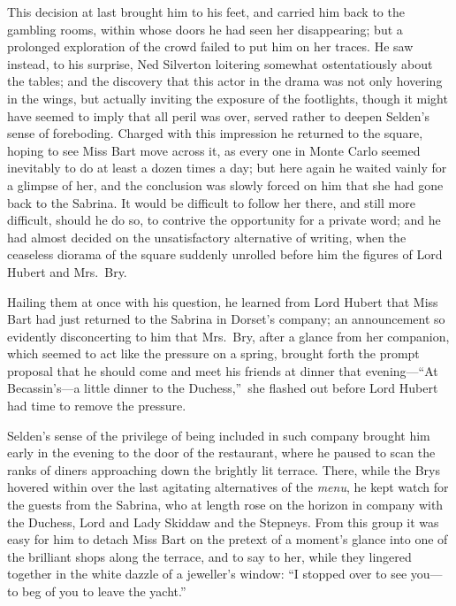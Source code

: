 \documentclass[12pt,a4paper]{book}
\begin{document}
This decision at last brought him to his feet, and carried him
back to the gambling rooms, within whose doors he had seen her
disappearing; but a prolonged exploration of the crowd
failed to put him on her traces. He saw instead, to his surprise,
Ned Silverton loitering somewhat ostentatiously about the tables;
and the discovery that this actor in the drama was not only
hovering in the wings, but actually inviting the exposure of the
footlights, though it might have seemed to imply that all peril
was over, served rather to deepen Selden's sense of foreboding. 
Charged with this impression he returned to the square, hoping to
see Miss Bart move across it, as every one in Monte Carlo seemed
inevitably to do at least a dozen times a day; but here again he
waited vainly for a glimpse of her, and the conclusion was slowly
forced on him that she had gone back to the Sabrina. It would be
difficult to follow her there, and still more difficult, should
he do so, to contrive the opportunity for a private word; and he
had almost decided on the unsatisfactory alternative of writing,
when the ceaseless diorama of the square suddenly unrolled before
him the figures of Lord Hubert and Mrs.\ Bry.





Hailing them at once with his question, he learned from Lord
Hubert that Miss Bart had just returned to the Sabrina in
Dorset's company; an announcement so evidently disconcerting to
him that Mrs.\ Bry, after a glance from her companion, which
seemed to act like the pressure on a spring, brought forth the
prompt proposal that he should come and meet his friends at
dinner that evening---``At Becassin's---a little dinner to the
Duchess,''\ she flashed out before Lord Hubert had time to remove
the pressure.





Selden's sense of the privilege of being included in such company
brought him early in the evening to the door of the restaurant,
where he paused to scan the ranks of diners approaching down the
brightly lit terrace. There, while the Brys hovered within over
the last agitating alternatives of the \textit{menu}, he kept watch for
the guests from the Sabrina, who at length rose on the horizon in
company with the Duchess, Lord and Lady Skiddaw and the Stepneys. 
From this group it was easy for him to detach Miss Bart on the
pretext of a moment's glance into one of the brilliant shops
along the terrace, and to say to her, while they lingered
together in the white dazzle of a jeweller's window: ``I stopped
over to see you---to beg of you to leave the yacht.''
\end{document}
